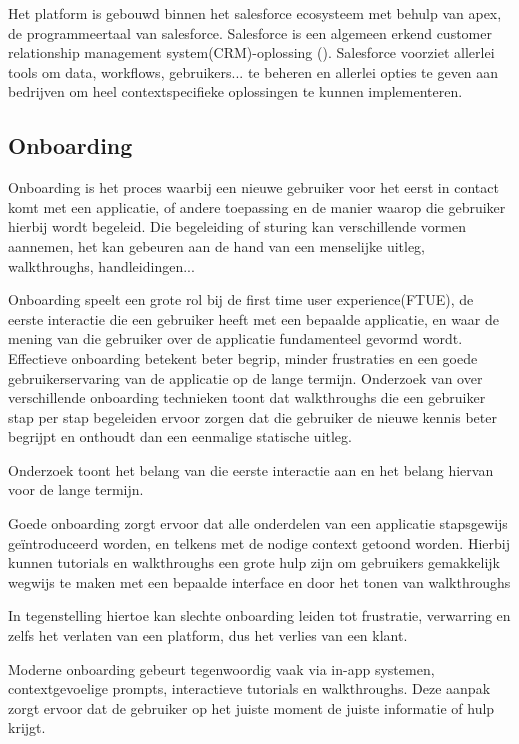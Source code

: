 Het platform is gebouwd binnen het salesforce ecosysteem met behulp van apex, de programmeertaal van salesforce. Salesforce is een algemeen erkend  customer relationship management system(CRM)-oplossing (\autocite{Pookandy2024}). Salesforce voorziet allerlei tools om data, workflows, gebruikers... te beheren en allerlei opties te geven aan bedrijven om heel contextspecifieke oplossingen te kunnen implementeren.



\subsection{Onboarding}
Onboarding is het proces waarbij een nieuwe gebruiker voor het eerst in contact komt met een applicatie, of andere toepassing en de manier waarop die gebruiker hierbij wordt begeleid. Die begeleiding of sturing kan verschillende vormen aannemen, het kan gebeuren aan de hand van een menselijke uitleg, walkthroughs, handleidingen... \autocite{Madhwacharyula2023}

Onboarding speelt een grote rol bij de first time user experience(FTUE), de eerste interactie die een gebruiker heeft met een bepaalde applicatie, en waar de mening van die gebruiker over de applicatie fundamenteel gevormd wordt. 
\autocite{CascaesCardoso2017}
Effectieve onboarding betekent beter begrip, minder frustraties en een goede gebruikerservaring van de applicatie op de lange termijn.
Onderzoek van \textcite{ChukwunonsoNweke2025} over verschillende onboarding technieken toont dat walkthroughs die een gebruiker stap per stap begeleiden ervoor zorgen dat die gebruiker de nieuwe kennis beter begrijpt en onthoudt dan een eenmalige statische uitleg.

Onderzoek toont het belang van die eerste interactie aan en het belang hiervan voor de lange termijn.

Goede onboarding zorgt ervoor dat alle onderdelen van een applicatie stapsgewijs geïntroduceerd worden, en telkens met de nodige context getoond worden. Hierbij kunnen tutorials en walkthroughs een grote hulp zijn om gebruikers gemakkelijk wegwijs te maken met een bepaalde interface en door het tonen van walkthroughs
\autocite{Kedzielska2023}
\autocite{Melenciano2025}

In tegenstelling hiertoe kan slechte onboarding  leiden tot frustratie, verwarring en zelfs het verlaten van een platform, dus het verlies van een klant.
\autocite{CascaesCardoso2017}

Moderne onboarding gebeurt tegenwoordig vaak via in-app systemen, contextgevoelige prompts, interactieve tutorials en walkthroughs. Deze aanpak zorgt ervoor dat de gebruiker op het juiste moment de juiste informatie of hulp krijgt. \autocite{Acar2020, Akiki2019}


